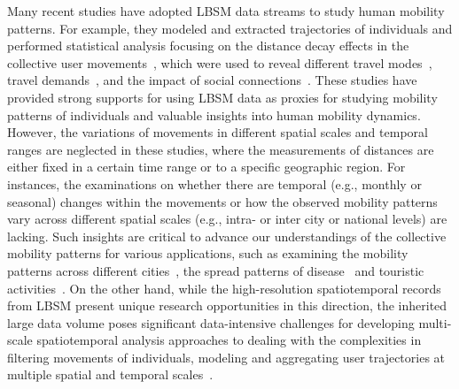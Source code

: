 \documentclass[ijgi,article,accept,moreauthors,pdftex,10pt,a4paper]{mdpi}
\theoremstyle{mdpi}
\newcounter{ex}
\newcounter{re}
\theoremstyle{mdpidefinition}
\begin{document}
Many recent studies have adopted LBSM data streams to study human mobility patterns.
For example, they modeled and extracted trajectories of individuals and performed statistical analysis focusing on the distance decay effects in the collective user movements~\cite{gonzalez2008understanding}, which were used to reveal different travel modes~\cite{Jurdak2015}, travel demands~\cite{wu2014intra,hasan2013understanding}, and the impact of social connections~\cite{cho2011friendship}.
These studies have provided strong supports for using LBSM data as proxies for studying mobility patterns of individuals and valuable insights into human mobility dynamics.
However, the variations of movements in different spatial scales and temporal ranges are neglected in these studies, where the measurements of distances are either fixed in a certain time range or to a specific geographic region.
For instances, the examinations on whether there are temporal (e.g., monthly or seasonal) changes within the movements or how the observed mobility patterns vary across different spatial scales (e.g., intra- or inter city or national levels) are lacking.
Such insights are critical to advance our understandings of the collective mobility patterns for various applications, such as examining the mobility patterns across different cities~\cite{noulas2012tale}, the spread patterns of disease~\cite{balcan2009multiscale, tamerius2011global} and touristic activities~\cite{hawelka2014geo}.
On the other hand, while the high-resolution spatiotemporal records from LBSM present unique research opportunities in this direction, the inherited large data volume poses significant data-intensive challenges for developing multi-scale spatiotemporal analysis approaches to dealing with the complexities in filtering movements of individuals, modeling and aggregating user trajectories at multiple spatial and temporal scales~\cite{tsou2015}.
\end{document}

